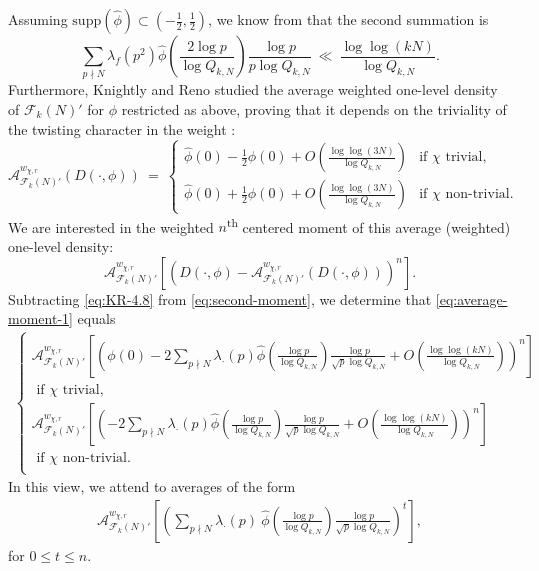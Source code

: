 \documentclass[12pt, reqno,oneside]{amsart}
\theoremstyle{plain}
\theoremstyle{definition}
\theoremstyle{remark}
\theoremstyle{plain}
\numberwithin{equation}{section}
\begin{document}
Assuming $\text{supp}(\widehat\phi) \subset \left(-\frac{1}{2},\frac{1}{2}\right)$, we know from \cite[88]{ILS00} that the second summation is
\begin{equation}
\sum_{p\nmid N}\lambda_f(p^2)\widehat{\phi}\left(\frac{2\log p}{\log Q_{k,N}}\right)\frac{\log p}{p\log Q_{k,N}} \ \ll \ \frac{\log\log(kN)}{\log Q_{k,N}}.
\end{equation}
Furthermore, Knightly and Reno studied the average weighted one-level density of $\mathcal{F}_k(N)'$ for $\phi$ restricted as above, proving that it depends on the triviality of the twisting character in the weight \cite[165]{KR18}: 
\begin{equation}\label{eq:KR-4.8}
\mathcal{A}^{w_{\chi,r}}_{\mathcal{F}_k(N)'}(D(\cdot,\phi)) \ = \ 
\begin{cases}
    \widehat{\phi}(0)-\frac{1}{2}\phi(0)+O\left(\frac{\log\log(3N)}{\log Q_{k,N}}\right) & \text{if }\chi\text{ trivial},\\
    \widehat{\phi}(0)+\frac{1}{2}\phi(0)+O\left(\frac{\log\log(3N)}{\log Q_{k,N}}\right) & \text{if }\chi\text{ non-trivial}.
\end{cases}
\end{equation}
We are interested in the weighted $n$\textsuperscript{th} centered moment of this average (weighted) one-level density:
\begin{equation}\label{eq:average-moment-1}
\mathcal{A}^{w_{\chi,r}}_{\mathcal{F}_k(N)'}\left[\left(D(\cdot,\phi)-\mathcal{A}^{w_{\chi,r}}_{\mathcal{F}_k(N)'}(D(\cdot,\phi))\right)^n\right].
\end{equation}
Subtracting \eqref{eq:KR-4.8} from \eqref{eq:second-moment}, we determine that \eqref{eq:average-moment-1} equals
\begin{align}\label{eq:1}
\begin{cases}
\mathcal{A}^{w_{\chi,r}}_{\mathcal{F}_k(N)'}\left[\left(\phi(0)-2\sum_{p\nmid N}\lambda_\cdot(p)\widehat{\phi}\left(\frac{\log p}{\log Q_{k,N}}\right)\frac{\log p}{\sqrt{p}\log Q_{k,N}}+O\left(\frac{\log\log(kN)}{\log Q_{k,N}}\right)\right)^n\right] \\ 
\text{ if } \chi \text{ trivial}, \\
\mathcal{A}^{w_{\chi,r}}_{\mathcal{F}_k(N)'}\left[\left(-2\sum_{p\nmid N}\lambda_\cdot(p)\widehat{\phi}\left(\frac{\log p}{\log Q_{k,N}}\right)\frac{\log p}{\sqrt{p}\log Q_{k,N}}+O\left(\frac{\log\log(kN)}{\log Q_{k,N}}\right)\right)^n\right] \\ 
\text{ if } \chi \text{ non-trivial}. \\
\end{cases}
\end{align}
In this view, we attend to averages of the form
\begin{align}\label{eq:1'}
\mathcal{A}^{w_{\chi,r}}_{\mathcal{F}_k(N)'}\left[\left(\sum\nolimits_{p\nmid N}\lambda_\cdot(p) \ \widehat{\phi}\left(\frac{\log p}{\log Q_{k,N}}\right)\frac{\log p}{\sqrt{p}\log Q_{k,N}}\right)^t\right],
\end{align} 
for $0\leq t\leq n$.
\end{document}
